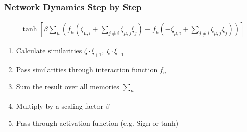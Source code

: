 \begin{frame}
    \frametitle{Network Dynamics Step by Step}
    \begin{gather*}
        \tanh \left[ \beta \sum_{\mu} \left( f_n \left(\zeta_{\mu, i} + \sum_{j \neq i} \zeta_{\mu, j} \xi_{j} \right) - f_n \left( -\zeta_{\mu, i} + \sum_{j \neq i} \zeta_{\mu, j} \xi_{j} \right) \right) \right]
    \end{gather*}

    \begin{enumerate}
        \item Calculate similarities \(\zeta \cdot \xi_{+1}, \; \zeta \cdot \xi_{-1}\)
        \item Pass similarities through interaction function \(f_n\)
        \item Sum the result over all memories \(\sum_\mu\)
        \item Multiply by a scaling factor \(\beta\)
        \item Pass through activation function (e.g. Sign or tanh)
    \end{enumerate}




\end{frame}
